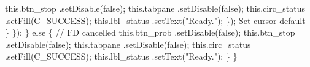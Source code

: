           this.btn_stop     .setDisable(false);
          this.tabpane      .setDisable(false);
          this.circ_status  .setFill(C_SUCCESS);
          this.lbl_status   .setText("Ready.");
        \});
        \LA{}Set cursor default~{\nwtagstyle{}}\RA{}
      \}
    \});
  \} else \{
    // FD cancelled
    this.btn_prob     .setDisable(false);
    this.btn_stop     .setDisable(false);
    this.tabpane      .setDisable(false);
    this.circ_status  .setFill(C_SUCCESS);
    this.lbl_status   .setText("Ready.");
  \}
\}
\nwendcode{}\nwdocspar

